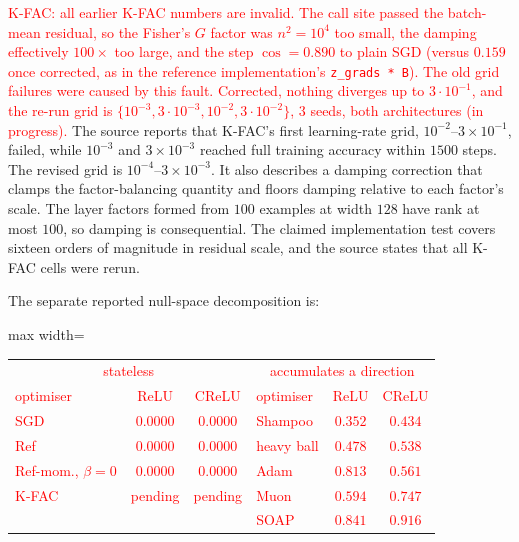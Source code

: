 \documentclass{article}
\newcommand{\nat}[1]{\textcolor{red}{#1}}
\theoremstyle{definition}
\theoremstyle{remark}
\begin{document}
\nat{K-FAC: all earlier K-FAC numbers are invalid. The call site passed the batch-mean residual, so the Fisher's $G$ factor was $n^2=10^4$ too small, the damping effectively $100\times$ too large, and the step $\cos=0.890$ to plain SGD (versus $0.159$ once corrected, as in the reference implementation's \texttt{z\_grads * B}). The old grid failures were caused by this fault. Corrected, nothing diverges up to $3\cdot10^{-1}$, and the re-run grid is $\{10^{-3},3\cdot10^{-3},10^{-2},3\cdot10^{-2}\}$, $3$ seeds, both architectures (in progress).} The source reports that K-FAC's first learning-rate grid, $10^{-2}$--$3\times10^{-1}$, failed, while $10^{-3}$ and $3\times10^{-3}$ reached full training accuracy within $1500$ steps. The revised grid is $10^{-4}$--$3\times10^{-3}$. It also describes a damping correction that clamps the factor-balancing quantity and floors damping relative to each factor's scale. The layer factors formed from $100$ examples at width $128$ have rank at most $100$, so damping is consequential. The claimed implementation test covers sixteen orders of magnitude in residual scale, and the source states that all K-FAC cells were rerun.

The separate reported null-space decomposition is:

\begin{center}\small
\begin{adjustbox}{max width=\linewidth}
\begin{tabular}{lcc|lcc}
\toprule
\multicolumn{3}{c|}{\nat{stateless}} & \multicolumn{3}{c}{\nat{accumulates a direction}} \\
\nat{optimiser} & \nat{ReLU} & \nat{CReLU} & \nat{optimiser} & \nat{ReLU} & \nat{CReLU} \\
\midrule
\nat{SGD} & \nat{$0.0000$} & \nat{$0.0000$} & \nat{Shampoo} & \nat{$0.352$} & \nat{$0.434$} \\
\nat{Ref} & \nat{$0.0000$} & \nat{$0.0000$} & \nat{heavy ball} & \nat{$0.478$} & \nat{$0.538$} \\
\nat{Ref-mom., $\beta=0$} & \nat{$0.0000$} & \nat{$0.0000$} & \nat{Adam} & \nat{$0.813$} & \nat{$0.561$} \\
\nat{K-FAC} & \nat{pending} & \nat{pending} & \nat{Muon} & \nat{$0.594$} & \nat{$0.747$} \\
      &  &  & \nat{SOAP} & \nat{$0.841$} & \nat{$0.916$} \\
\bottomrule
\end{tabular}
\end{adjustbox}
\end{center}
\end{document}
